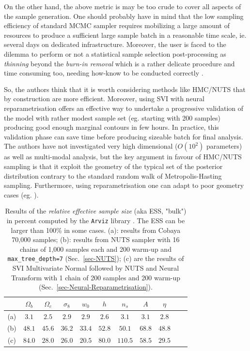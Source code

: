 \documentclass[final,5p,times,twocolumn,authoryear]{elsarticle}
\begin{document}
On the other hand, the above metric is may be too crude to cover all aspects of the sample generation. One should probably have in mind that the low sampling efficiency of standard MCMC sampler requires mobilizing a large amount of resources to produce a sufficient large sample batch in a reasonable time scale, ie. several days on dedicated infrastructure. Moreover, the user is faced to the dilemma to perform or not a statistical sample selection post-processing as \textit{thinning} beyond the \textit{burn-in removal} which is a rather delicate procedure and time consuming too, needing how-know to be conducted correctly \citep{doi:10.1146/annurev-statistics-040220-091727, 2015arXiv151007727O}. 

So, the authors think that it is worth considering methods like HMC/NUTS that by construction are more efficient. Moreover, using SVI with neural reparametrisation offers an effective way to undertake a progressive validation of the model with rather modest sample set (eg. starting with 200 samples) producing good enough marginal contours in few hours. In practice, this validation phase can save time before producing sizeable batch for final analysis. The authors have not investigated very high dimensional ($O(10^2)$ parameters) as well as multi-modal analysis, but the key argument in favour of HMC/NUTS sampling is that it exploit the geometry of the typical set of the posterior distribution contrary to the standard random walk of Metropolis-Hasting sampling. Furthermore, using reparametrisation  one can adapt to poor geometry cases (eg. \cite{2019arXiv190303704H}).
%
\begin{table}[htb]
\caption{Results of the \textit{relative effective sample size} (aka ESS, "bulk") in percent computed by the \texttt{Arviz} library \citep{arviz_2019}. The ESS can be larger than 100\% in some cases. 
(a): results from Cobaya 70,000 samples;
(b): results from NUTS sampler with 16 chains of 1,000 samples each and 200 warm-up and \texttt{max\_tree\_depth=7} (Sec.~\ref{sec-NUTS}); 
(c) are the results of SVI Multivariate Normal followed by NUTS and Neural Transform  with 1 chain of 200 samples and 200 warm-up (Sec.~\ref{sec-Neural-Reparametrisation}).}
\label{tab-ESS-NUTS_SVI-1}
 \centering
\begin{tabular}{ccccccccccc}
\hline
    & $\Omega_b$ & $\Omega_c$ & $\sigma_8$ & $w_0$ & $h$ & $n_s$ & $A$ & $\eta$\\
\hline
(a) &  $3.1$ & $2.5$       & $2.9$      & $2.9$  & $2.6$  & $3.1$  & $3.1$ & $2.8$ \\  
(b) & $48.1$ &  $45.6$     & $36.2$     & $33.4$ & $52.8$ & $50.1$ & $68.8$ & $48.8$\\
(c) & $84.0$ &  $28.0$     & $26.0$     & $20.5$ & $80.0$ & $110.5$ & $58.5$ & $29.5$\\
\hline
\end{tabular}
\end{table}
\end{document}

